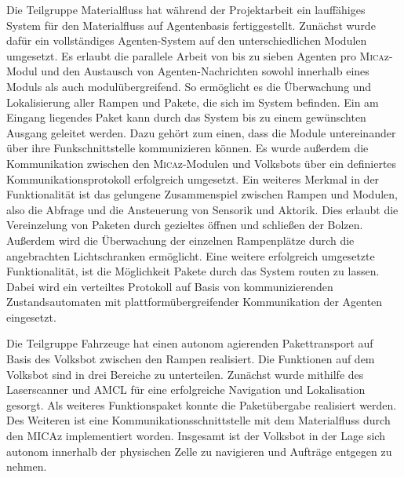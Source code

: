 Die Teilgruppe Materialfluss hat während der Projektarbeit ein lauffähiges System für den Materialfluss auf Agentenbasis fertiggestellt. Zunächst wurde dafür ein vollständiges Agenten-System auf den unterschiedlichen Modulen umgesetzt. Es erlaubt die parallele Arbeit von bis zu sieben Agenten pro \textsc{Mica}z-Modul und den Austausch von Agenten-Nachrichten sowohl innerhalb eines Moduls als auch modulübergreifend. So ermöglicht es die Überwachung und Lokalisierung aller Rampen und Pakete, die sich im System befinden. Ein am Eingang liegendes Paket kann durch das System bis zu einem gewünschten Ausgang geleitet werden. Dazu gehört zum einen, dass die Module untereinander über ihre Funkschnittstelle kommunizieren können. Es wurde außerdem die Kommunikation zwischen den \textsc{Mica}z-Modulen und Volksbots über ein definiertes Kommunikationsprotokoll erfolgreich umgesetzt. Ein weiteres Merkmal in der Funktionalität ist das gelungene Zusammenspiel zwischen Rampen und Modulen, also die Abfrage und die Ansteuerung von Sensorik und Aktorik. Dies erlaubt die Vereinzelung von Paketen durch gezieltes öffnen und schließen der Bolzen. Außerdem wird die Überwachung der einzelnen Rampenplätze durch die angebrachten Lichtschranken ermöglicht. Eine weitere erfolgreich umgesetzte Funktionalität, ist die Möglichkeit Pakete durch das System routen zu lassen. Dabei wird ein verteiltes Protokoll auf Basis von kommunizierenden Zustandsautomaten mit plattformübergreifender Kommunikation der Agenten eingesetzt.

Die Teilgruppe Fahrzeuge hat einen autonom agierenden Pakettransport auf Basis des Volksbot zwischen den Rampen realisiert. Die Funktionen auf dem Volksbot sind in drei Bereiche zu unterteilen. Zunächst wurde mithilfe des Laserscanner und AMCL für eine erfolgreiche Navigation und Lokalisation gesorgt. Als weiteres Funktionspaket konnte die Paketübergabe realisiert werden. Des Weiteren ist eine Kommunikationsschnittstelle mit dem Materialfluss durch den MICAz implementiert worden.
Insgesamt ist der Volksbot in der Lage sich autonom innerhalb der physischen Zelle zu navigieren und Aufträge entgegen zu nehmen. 


